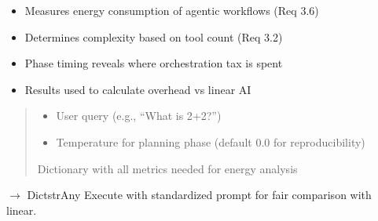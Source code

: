 \documentclass[letterpaper,10pt,english]{sphinxmanual}
\begin{document}
\begin{fulllineitems}
\begin{fulllineitems}
\begin{description}
\begin{itemize}
\item {} 
\sphinxAtStartPar
Measures energy consumption of agentic workflows (Req 3.6)

\item {} 
\sphinxAtStartPar
Determines complexity based on tool count (Req 3.2)

\item {} 
\sphinxAtStartPar
Phase timing reveals where orchestration tax is spent

\item {} 
\sphinxAtStartPar
Results used to calculate overhead vs linear AI

\end{itemize}

\end{description}
\begin{quote}\begin{description}
\begin{itemize}
\item {} 
\sphinxAtStartPar
{} \textendash{} User query (e.g., “What is 2+2?”)

\item {} 
\sphinxAtStartPar
{} \textendash{} Temperature for planning phase (default 0.0 for reproducibility)

\end{itemize}

\sphinxAtStartPar
Dictionary with all metrics needed for energy analysis

\end{description}\end{quote}

\end{fulllineitems}


\begin{fulllineitems}
\label{\detokenize{core.execution:core.execution.AgenticExecutor.execute_comparison}}
\pysigstartsignatures
\pysiglinewithargsret
{}
{}
{{ $\rightarrow$ Dict\DUrole{p}{{[}}strAny\DUrole{p}{{]}}}}
\pysigstopsignatures
\sphinxAtStartPar
Execute with standardized prompt for fair comparison with linear.


\end{fulllineitems}
\end{fulllineitems}
\end{document}
